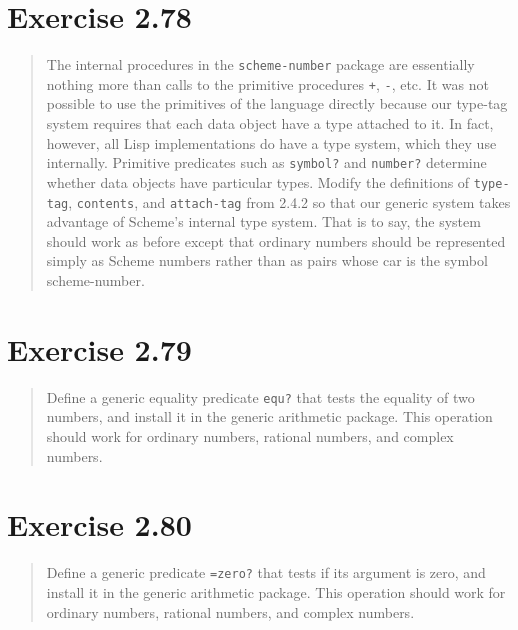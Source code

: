 \documentclass{article}
\begin{document}
\section{Exercise 2.78}
\begin{quote}
    The internal procedures in the \texttt{scheme-number} package are
    essentially nothing more than calls to the primitive procedures \texttt{+},
    \texttt{-}, etc. It was not possible to use the primitives of the language
    directly because our type-tag system requires that each data object have a
    type attached to it. In fact, however, all Lisp implementations do have a
    type system, which they use internally. Primitive predicates such as
    \texttt{symbol?} and \texttt{number?} determine whether data objects have
    particular types. Modify the definitions of \texttt{type-tag},
    \texttt{contents}, and \texttt{attach-tag} from 2.4.2 so that our generic
    system takes advantage of Scheme's internal type system. That is to say,
    the system should work as before except that ordinary numbers should be
    represented simply as Scheme numbers rather than as pairs whose car is the
    symbol scheme-number.
\end{quote}



\section{Exercise 2.79}
\begin{quote}
    Define a generic equality predicate \texttt{equ?} that tests the equality
    of two numbers, and install it in the generic arithmetic package. This
    operation should work for ordinary numbers, rational numbers, and complex
    numbers.
\end{quote}



\section{Exercise 2.80}
\begin{quote}
    Define a generic predicate \texttt{=zero?} that tests if its argument is
    zero, and install it in the generic arithmetic package. This operation
    should work for ordinary numbers, rational numbers, and complex numbers.
\end{quote}


\end{document}
